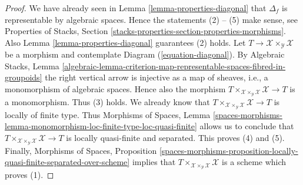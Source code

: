 \documentclass[10pt,a4paper]{amsart}
\theoremstyle{plain}
\theoremstyle{definition}
\theoremstyle{remark}
\numberwithin{equation}{subsection}
\begin{document}
\begin{proof}
We have already seen in
Lemma \ref{lemma-properties-diagonal}
that $\Delta_f$ is representable by algebraic
spaces. Hence the statements (2) -- (5) make sense, see
Properties of Stacks,
Section \ref{stacks-properties-section-properties-morphisms}.
Also
Lemma \ref{lemma-properties-diagonal}
guarantees (2) holds.
Let $T \to \mathcal{X} \times_\mathcal{Y} \mathcal{X}$ be a morphism
and contemplate Diagram (\ref{equation-diagonal}). By
Algebraic Stacks, Lemma
\ref{algebraic-lemma-criterion-map-representable-spaces-fibred-in-groupoids}
the right vertical arrow is injective as a map of sheaves, i.e., a
monomorphism of algebraic spaces. Hence also the morphism
$T \times_{\mathcal{X} \times_\mathcal{Y} \mathcal{X}} \mathcal{X} \to T$
is a monomorphism. Thus (3) holds. We already know that
$T \times_{\mathcal{X} \times_\mathcal{Y} \mathcal{X}} \mathcal{X} \to T$
is locally of finite type. Thus
Morphisms of Spaces, Lemma
\ref{spaces-morphisms-lemma-monomorphism-loc-finite-type-loc-quasi-finite}
allows us to conclude that
$T \times_{\mathcal{X} \times_\mathcal{Y} \mathcal{X}} \mathcal{X} \to T$
is locally quasi-finite and separated. This proves (4) and (5).
Finally,
Morphisms of Spaces, Proposition
\ref{spaces-morphisms-proposition-locally-quasi-finite-separated-over-scheme}
implies that
$T \times_{\mathcal{X} \times_\mathcal{Y} \mathcal{X}} \mathcal{X}$
is a scheme which proves (1).
\end{proof}
\end{document}
